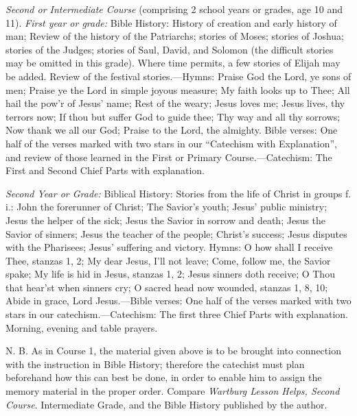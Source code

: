 \emph{Second or Intermediate Course} (comprising 2 school years or grades, age 10 and 11). \emph{First year or grade:} Bible History: History of creation and early history of man; Review of the history of the Patriarchs; stories of Moses; stories of Joshua; stories of the Judges; stories of Saul, David, and Solomon (the difficult stories may be omitted in this grade). Where time permits, a few stories of Elijah may be added. Review of the festival stories.—Hymns: Praise God the Lord, ye sons of men; Praise ye the Lord in simple joyous measure; My faith looks up to Thee; All hail the pow’r of Jesus’ name; Rest of the weary; Jesus loves me; Jesus lives, thy terrors now; If thou but suffer God to guide thee; Thy way and all thy sorrows; Now thank we all our God; Praise to the Lord, the almighty. Bible verses: One half of the verses marked with two stars in our “Catechism with Explanation”, and review of those learned in the First or Primary Course.—Catechism: The First and Second Chief Parts with explanation.

\emph{Second Year or Grade:} Biblical History: Stories from the life of Christ in groups f. i.: John the forerunner of Christ; The Savior’s youth; Jesus’ public ministry; Jesus the helper of the sick; Jesus the Savior in sorrow and death; Jesus the Savior of sinners; Jesus the teacher of the people; Christ’s success; Jesus disputes with the Pharisees; Jesus’ suffering and victory. Hymns: O how shall I receive Thee, stanzas 1, 2; My dear Jesus, I’ll not leave; Come, follow me, the Savior spake; My life is hid in Jesus, stanzas 1, 2; Jesus sinners doth receive; O Thou that hear’st when sinners cry; O sacred head now wounded, stanzas 1, 8, 10; Abide in grace, Lord Jesus.—Bible verses: One half of the verses marked with two stars in our catechism.—Catechism: The first three Chief Parts with explanation. Morning, evening and table prayers.

N. B. As in Course 1, the material given above is to be brought into connection with the instruction in Bible History; therefore the catechist must plan beforehand how this can best be done, in order to enable him to assign the memory material in the proper order. Compare \emph{Wartburg Lesson Helps, Second Course}. Intermediate Grade, and the Bible History published by the author.

